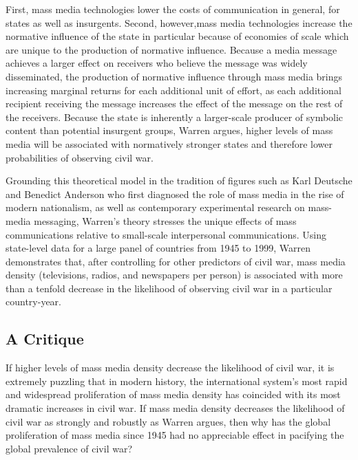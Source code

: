 \documentclass[11pt,article,oneside]{memoir}
\begin{document}
First, mass media technologies lower the costs of communication in
general, for states as well as insurgents. Second, however,mass media
technologies increase the normative influence of the state in particular
because of economies of scale which are unique to the production of
normative influence. Because a media message achieves a larger effect on
receivers who believe the message was widely disseminated, the
production of normative influence through mass media brings increasing
marginal returns for each additional unit of effort, as each additional
recipient receiving the message increases the effect of the message on
the rest of the receivers. Because the state is inherently a
larger-scale producer of symbolic content than potential insurgent
groups, Warren argues, higher levels of mass media will be associated
with normatively stronger states and therefore lower probabilities of
observing civil war.

Grounding this theoretical model in the tradition of figures such as
Karl Deutsche and Benedict Anderson who first diagnosed the role of mass
media in the rise of modern nationalism, as well as contemporary
experimental research on mass-media messaging, Warren's theory stresses
the unique effects of mass communications relative to small-scale
interpersonal communications. Using state-level data for a large panel
of countries from 1945 to 1999, Warren demonstrates that, after
controlling for other predictors of civil war, mass media density
(televisions, radios, and newspapers per person) is associated with more
than a tenfold decrease in the likelihood of observing civil war in a
particular country-year.

\subsection{A Critique}\label{a-critique}

If higher levels of mass media density decrease the likelihood of civil
war, it is extremely puzzling that in modern history, the international
system's most rapid and widespread proliferation of mass media density
has coincided with its most dramatic increases in civil war. If mass
media density decreases the likelihood of civil war as strongly and
robustly as Warren argues, then why has the global proliferation of mass
media since 1945 had no appreciable effect in pacifying the global
prevalence of civil war?
\end{document}
